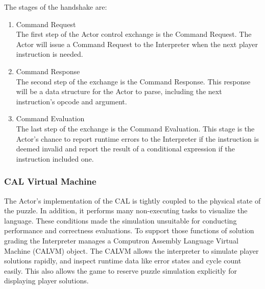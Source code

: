\newpage
The stages of the handshake are:
\begin{enumerate}
	\item Command Request\\
	The first step of the Actor control exchange is the Command Request. The Actor 
	will issue a Command Request to the Interpreter when the next player instruction is needed.
	\item Command Response\\
	The second step of the exchange is the Command Response. This response will be a 
	data structure for the Actor to parse, including the next instruction's opcode and argument.
	\item Command Evaluation\\
	The last step of the exchange is the Command Evaluation. This stage is the Actor's chance 
	to report runtime errors to the Interpreter if the instruction is deemed invalid and report 
	the result of a conditional expression if the instruction included one. 
\end{enumerate}

\subsubsection{CAL Virtual Machine}
The Actor's implementation of the CAL is tightly coupled to the physical state of the puzzle. In addition,
it performs many non-executing tasks to visualize the language. These conditions made the simulation unsuitable for 
conducting performance and correctness evaluations. To support those functions of solution grading the Interpreter
manages a Computron Assembly Language Virtual Machine (CALVM) object. The CALVM allows the interpreter to simulate
player solutions rapidly, and inspect runtime data like error states and cycle count easily. This also allows the game to
reserve puzzle simulation explicitly for displaying player solutions.